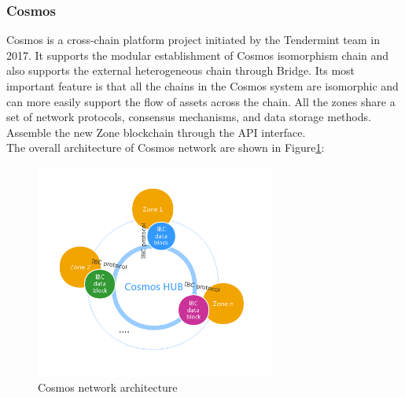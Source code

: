 \subsubsection{Cosmos}
\noindent Cosmos\cite{cosmos} is a cross-chain platform project initiated by the Tendermint team in 2017. It supports the modular establishment of Cosmos isomorphism chain and also supports the external heterogeneous chain through Bridge. Its most important feature is that all the chains in the Cosmos system are isomorphic and can more easily support the flow of assets across the chain. All the zones share a set of network protocols, consensus mechanisms, and data storage methods. Assemble the new Zone blockchain through the API interface.\\
\noindent The overall architecture of Cosmos network are shown in Figure\ref{fig:cosmos}:
        \begin{figure}[H]
        \includegraphics[width=0.7\textwidth]{./figures/cosmos.png}
        \centering
        \caption{Cosmos network architecture}%
        \centering
        \label{fig:cosmos}
        \end{figure}
        
